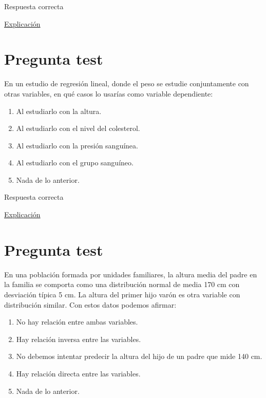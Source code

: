 \documentclass[
]{book}
\providecommand{\tightlist}{%
  \setlength{\itemsep}{0pt}\setlength{\parskip}{0pt}}
\begin{document}
Respuesta correcta

\href{https://1fjmanzano.github.io/bioestadistica/relaci\%C3\%B3n-entre-variables-nume\%CC\%81ricas.html\#coeficiente-de-correlacio\%CC\%81n}{Explicación}

\hypertarget{pregunta-test-115}{%
\section{Pregunta test}\label{pregunta-test-115}}

En un estudio de regresión lineal, donde el peso se estudie conjuntamente con otras variables, en qué casos lo usarías como variable dependiente:

\begin{enumerate}
\def\labelenumi{\alph{enumi})}
\tightlist
\item
  Al estudiarlo con la altura.
\item
  Al estudiarlo con el nivel del colesterol.
\item
  Al estudiarlo con la presión sanguínea.
\item
  Al estudiarlo con el grupo sanguíneo.
\item
  Nada de lo anterior.
\end{enumerate}

Respuesta correcta

\href{https://www.cdc.gov/healthyweight/spanish/assessing/bmi/adult_bmi/index.html}{Explicación}

\hypertarget{pregunta-test-116}{%
\section{Pregunta test}\label{pregunta-test-116}}

En una población formada por unidades familiares, la altura media del padre en la familia se comporta como una distribución normal de media 170 cm con desviación típica 5 cm. La altura del primer hijo varón es otra variable con distribución similar. Con estos datos podemos afirmar:

\begin{enumerate}
\def\labelenumi{\alph{enumi})}
\tightlist
\item
  No hay relación entre ambas variables.
\item
  Hay relación inversa entre las variables.
\item
  No debemos intentar predecir la altura del hijo de un padre que mide 140 cm.
\item
  Hay relación directa entre las variables.
\item
  Nada de lo anterior.
\end{enumerate}
\end{document}
